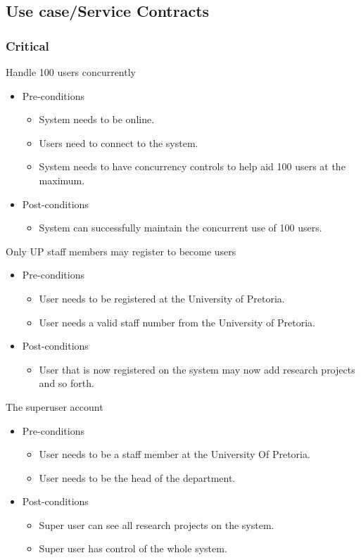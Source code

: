 \documentclass[a4paper,12pt]{report}
\begin{document}
\subsection{Use case/Service Contracts}
\subsubsection{Critical}
	Handle 100 users concurrently
	\begin{itemize}
		\item Pre-conditions
			\begin{itemize}
				\item System needs to be online.
				\item Users need to connect to the system.
				\item System needs to have concurrency controls to help aid 100 users at the maximum.
			\end{itemize}
		\item Post-conditions
			\begin{itemize}
				\item System can successfully maintain the concurrent use of 100 users.
			\end{itemize}
	\end{itemize}

	Only UP staff members may register to become users
	\begin{itemize}
		\item Pre-conditions
			\begin{itemize}
				\item User needs to be registered at the University of Pretoria.
				\item User needs a valid staff number from the University of Pretoria.
			\end{itemize}
		\item Post-conditions
			\begin{itemize}
				\item User that is now registered on the system may now add research projects and so forth.
			\end{itemize}
	\end{itemize}

	The superuser account
	\begin{itemize}
		\item Pre-conditions
			\begin{itemize}
				\item User needs to be a staff member at the University Of Pretoria.
				\item User needs to be the head of the department.
			\end{itemize}
		\item Post-conditions
			\begin{itemize}
				\item Super user can see all research projects on the system.
				\item Super user has control of the whole system.
			\end{itemize}
	\end{itemize}
\end{document}
